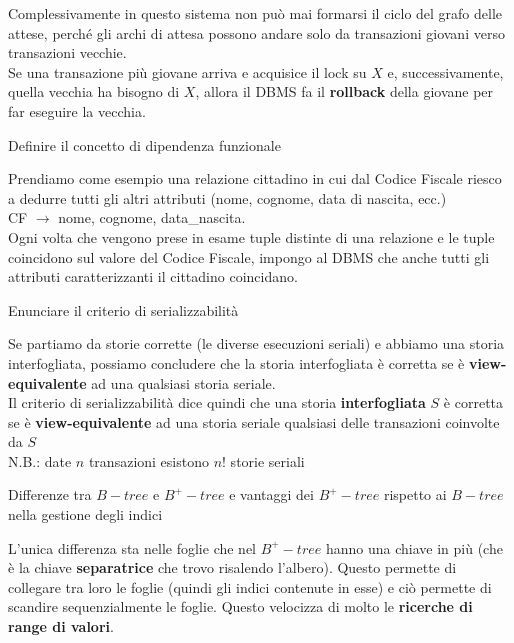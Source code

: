 \documentclass{exam}
\begin{document}
\begin{questions}
\begin{solution}
\begin{description}
            Complessivamente in questo sistema non può mai formarsi il ciclo del grafo delle attese, perché gli archi di attesa possono andare solo da transazioni giovani verso transazioni vecchie.\\
            Se una transazione più giovane arriva e acquisice il lock su $X$ e, successivamente, quella vecchia ha bisogno di $X$, allora il DBMS fa il \textbf{rollback} della giovane per far eseguire la vecchia.
        \end{description}
    \end{solution}
    \question Definire il concetto di dipendenza funzionale
    \begin{solution}
        Prendiamo come esempio una relazione cittadino in cui dal Codice Fiscale riesco a dedurre tutti gli altri attributi (nome, cognome, data di nascita, ecc.)\\
        CF $\rightarrow$ nome, cognome, data\_nascita.\\
        Ogni volta che vengono prese in esame tuple distinte di una relazione e le tuple coincidono sul valore del Codice Fiscale, 
        impongo al DBMS che anche tutti gli attributi caratterizzanti il cittadino coincidano.
    \end{solution}
    \question Enunciare il criterio di serializzabilità
    \begin{solution}
        Se partiamo da storie corrette (le diverse esecuzioni  seriali) e abbiamo una storia interfogliata, possiamo  concludere che la storia interfogliata è corretta se è \textbf{view-equivalente} ad una qualsiasi storia seriale.\\
        Il criterio di serializzabilità dice quindi che una storia \textbf{interfogliata} $S$ è corretta se è \textbf{view-equivalente} ad una storia seriale qualsiasi delle transazioni coinvolte da $S$ \\
        N.B.: date $n$ transazioni esistono $n!$ storie seriali
    \end{solution}
    \question Differenze tra $B-tree$ e $B^{+}-tree$ e vantaggi dei $B^{+}-tree$ rispetto ai $B-tree$ nella gestione degli indici
    \begin{solution}
        L'unica differenza sta nelle foglie che nel $B^{+}-tree$ hanno una chiave in più (che è la chiave \textbf{separatrice} che trovo risalendo l'albero). 
        Questo permette di collegare tra loro le foglie (quindi gli indici contenute in esse) e ciò permette di scandire sequenzialmente le foglie. Questo 
        velocizza di molto le \textbf{ricerche di range di valori}.

\end{solution}
\end{questions}
\end{document}
